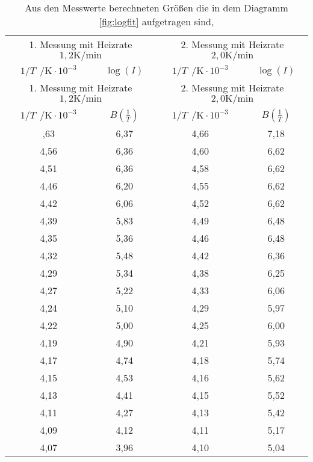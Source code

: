 \begin{longtable}{c c || c c}
  \caption{Aus den Messwerte berechneten Größen die in dem Diagramm \ref{fig:logfit} aufgetragen sind,}
  \label{tab:integral}\\
  \toprule
  \multicolumn{2}{c}{1. Messung mit Heizrate $1,2 \si{\kelvin\per\minute}$ } & \multicolumn{2}{c}{2. Messung mit Heizrate $2,0 \si{\kelvin\per\minute}$ }\\
  $1/T \ \ \si{\per\kelvin} \cdot 10^{-3}$  & $\log(I)$ & $1/T \ \ \si{\per\kelvin} \cdot 10^{-3}$  & $\log(I)$\\
  \midrule
  \endfirsthead
  \hline
  \multicolumn{2}{c}{1. Messung mit Heizrate $1,2 \si{\kelvin\per\minute}$ } & \multicolumn{2}{c}{2. Messung mit Heizrate $2,0 \si{\kelvin\per\minute}$ }\\
  $1/T \ \ \si{\per\kelvin} \cdot 10^{-3}$  & $B(\frac{1}{T})$ & $1/T \ \ \si{\per\kelvin} \cdot 10^{-3}$  & $B(\frac{1}{T})$\\
  \midrule
  \endhead
  \hline
  \endfoot
  \bottomrule
  \endlastfoot
4,63 &       6,37 &  4,66 &        7,18 \\
4,56 &       6,36 &  4,60  &        6,62 \\
4,51 &       6,36 &  4,58 &        6,62 \\
4,46 &       6,20  &  4,55 &        6,62 \\
4,42 &       6,06 &  4,52 &        6,62 \\
4,39 &       5,83 &  4,49 &        6,48 \\
4,35 &       5,36 &  4,46 &        6,48 \\
4,32 &       5,48 &  4,42 &        6,36 \\
4,29 &       5,34 &  4,38 &        6,25 \\
4,27 &       5,22 &  4,33 &        6,06 \\
4,24 &       5,10  &  4,29 &        5,97 \\
4,22 &       5,00    &  4,25 &        6,00    \\
4,19 &       4,90  &  4,21 &        5,93 \\
4,17 &       4,74 &  4,18 &        5,74 \\
4,15 &       4,53 &  4,16 &        5,62 \\
4,13 &       4,41 &  4,15 &        5,52 \\
4,11 &       4,27 &  4,13 &        5,42 \\
4,09 &       4,12 &  4,11 &        5,17 \\
4,07 &       3,96 &  4,10  &        5,04 \\

\end{longtable}
